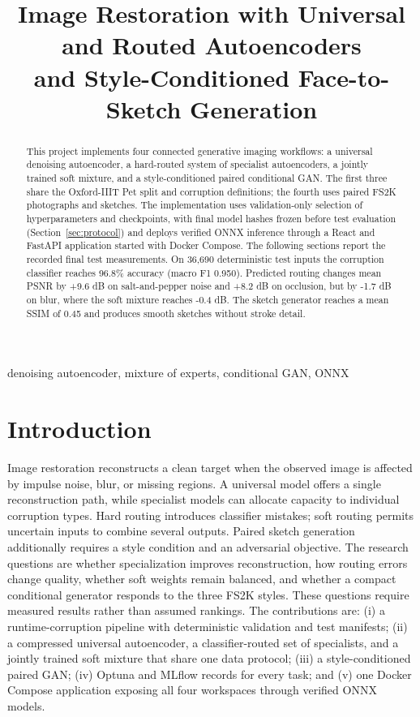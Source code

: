 \documentclass[conference]{IEEEtran}
\title{Image Restoration with Universal and Routed Autoencoders\\and Style-Conditioned Face-to-Sketch Generation}
\author{\IEEEauthorblockN{Muhammad Abdullah Masood}\IEEEauthorblockA{23I-0756\\Generative AI}}
\begin{document}
\maketitle
\begin{abstract}
This project implements four connected generative imaging workflows: a universal
denoising autoencoder, a hard-routed system of specialist autoencoders, a jointly
trained soft mixture, and a style-conditioned paired conditional GAN. The first
three share the Oxford-IIIT Pet split and corruption definitions; the fourth
uses paired FS2K photographs and sketches. The implementation uses
validation-only selection of hyperparameters and checkpoints, with final model hashes frozen before test evaluation (Section~\ref{sec:protocol}) and deploys
verified ONNX inference through a React and FastAPI application started with
Docker Compose. The following sections report the recorded final test measurements. On 36,690 deterministic test inputs the corruption classifier reaches 96.8\% accuracy (macro F1 0.950). Predicted routing changes mean PSNR by +9.6 dB on salt-and-pepper noise and +8.2 dB on occlusion, but by -1.7 dB on blur, where the soft mixture reaches -0.4 dB. The sketch generator reaches a mean SSIM of 0.45 and produces smooth sketches without stroke detail.
\end{abstract}
\begin{IEEEkeywords}denoising autoencoder, mixture of experts, conditional GAN, ONNX\end{IEEEkeywords}

\section{Introduction}
Image restoration reconstructs a clean target when the observed image is
affected by impulse noise, blur, or missing regions. A universal model offers a
single reconstruction path, while specialist models can allocate capacity to
individual corruption types. Hard routing introduces classifier mistakes; soft
routing permits uncertain inputs to combine several outputs. Paired sketch
generation additionally requires a style condition and an adversarial objective.
The research questions are whether specialization improves reconstruction,
how routing errors change quality, whether soft weights remain balanced, and
whether a compact conditional generator responds to the three FS2K styles.
These questions require measured results rather than assumed rankings.
The contributions are: (i) a runtime-corruption pipeline with deterministic
validation and test manifests; (ii) a compressed universal autoencoder, a
classifier-routed set of specialists, and a jointly trained soft mixture that
share one data protocol; (iii) a style-conditioned paired GAN; (iv) Optuna and
MLflow records for every task; and (v) one Docker Compose application exposing
all four workspaces through verified ONNX models.
\end{document}
